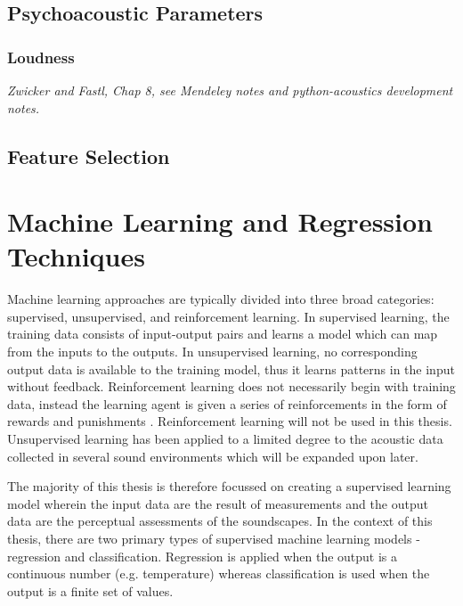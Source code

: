  \subsection{Psychoacoustic Parameters}

   \subsubsection{Loudness}
   \emph{Zwicker and Fastl, Chap 8, see Mendeley notes and python-acoustics development notes.}
 \subsection{Feature Selection}

\section{Machine Learning and Regression Techniques}
Machine learning approaches are typically divided into three broad categories: supervised, unsupervised, and reinforcement learning. In supervised learning, the training data consists of input-output pairs and learns a model which can map from the inputs to the outputs. In unsupervised learning, no corresponding output data is available to the training model, thus it learns patterns in the input without feedback. Reinforcement learning does not necessarily begin with training data, instead the learning agent is given a series of reinforcements in the form of rewards and punishments \citep{StuartRussell2021}. Reinforcement learning will not be used in this thesis. Unsupervised learning has been applied to a limited degree to the acoustic data collected in several sound environments which will be expanded upon later. 

The majority of this thesis is therefore focussed on creating a supervised learning model wherein the input data are the result of measurements and the output data are the perceptual assessments of the soundscapes. In the context of this thesis, there are two primary types of supervised machine learning models - regression and classification. Regression is applied when the output is a continuous number (e.g. temperature) whereas classification is used when the output is a finite set of values. 

